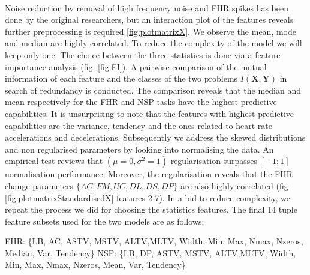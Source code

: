 \documentclass[11pt,a4paper]{article}
\begin{document}
\paragraph{}
Noise reduction by removal of high frequency noise and FHR spikes has been done by the original researchers, but an interaction plot of the features reveals further preprocessing is required \ref{fig:plotmatrixX}. We observe the mean, mode and median are highly correlated.
To reduce the complexity of the model we will keep only one. The choice between the three statistics is done via a feature importance analysis (fig. \ref{fig:FI}). A pairwise comparison of the mutual information of each feature and the classes of the two problems \(I(\boldsymbol{X},\boldsymbol{Y})\) in search of redundancy \autocite{FeatureImportance} is conducted. The comparison reveals that the median and mean respectively for the FHR and NSP tasks have the highest predictive capabilities. It is unsurprising to note that the features with highest predictive capabilities are the variance, tendency and the ones related to heart rate accelerations and decelerations. Subsequently we address the skewed distributions and non regularised parameters by looking into normalising the data. An empirical test reviews that \((\mu = 0, \sigma^2 = 1)\) regularisation surpasses \([-1;1]\) normalisation performance. Moreover, the regularisation reveals that the FHR change parameters \(\{AC,FM,UC,DL,DS,DP\}\) are also highly correlated (fig \ref{fig:plotmatrixStandardisedX} features 2-7). In a bid to reduce complexity, we repeat the process we did for choosing the statistics features. The final 14 tuple feature subsets used for the two models are as follows:
\begin{outline}
  \1 FHR: \{LB, AC, ASTV, MSTV, ALTV,MLTV, Width, Min, Max, Nmax, Nzeros, Median, Var, Tendency\}
  \1 NSP: \{LB, DP, ASTV, MSTV, ALTV,MLTV, Width, Min, Max, Nmax, Nzeros, Mean, Var, Tendency\}
\end{outline}
\end{document}
